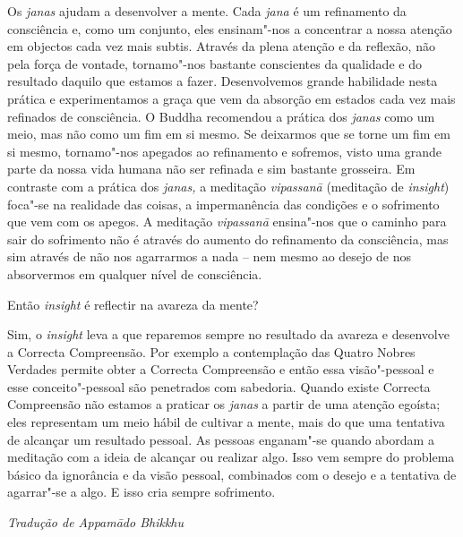  Os \emph{janas} ajudam a desenvolver a mente. Cada \emph{jana}
é um refinamento da consciência e, como um conjunto, eles ensinam"-nos a
concentrar a nossa atenção em objectos cada vez mais subtis. Através da
plena atenção e da reflexão, não pela força de vontade, tornamo"-nos
bastante conscientes da qualidade e do resultado daquilo que estamos a
fazer. Desenvolvemos grande habilidade nesta prática e experimentamos a
graça que vem da absorção em estados cada vez mais refinados de
consciência. O Buddha recomendou a prática dos \emph{janas} como um
meio, mas não como um fim em si mesmo. Se deixarmos que se torne um fim
em si mesmo, tornamo"-nos apegados ao refinamento e sofremos, visto uma
grande parte da nossa vida humana não ser refinada e sim bastante
grosseira. Em contraste com a prática dos \emph{janas,} a meditação
\emph{vipassanā} (meditação de \emph{insight}) foca"-se na realidade das
coisas, a impermanência das condições e o sofrimento que vem com os
apegos. A meditação \emph{vipassanā} ensina"-nos que o caminho para sair
do sofrimento não é através do aumento do refinamento da consciência,
mas sim através de não nos agarrarmos a nada -- nem mesmo ao desejo de
nos absorvermos em qualquer nível de consciência.

\bigskip

 Então \emph{insight} é reflectir na avareza da mente?

 Sim, o \emph{insight} leva a que reparemos sempre no resultado
da avareza e desenvolve a Correcta Compreensão. Por exemplo a
contemplação das Quatro Nobres Verdades permite obter a Correcta
Compreensão e então essa visão"-pessoal e esse conceito"-pessoal são
penetrados com sabedoria. Quando existe Correcta Compreensão não estamos
a praticar os \emph{janas} a partir de uma atenção egoísta; eles
representam um meio hábil de cultivar a mente, mais do que uma tentativa
de alcançar um resultado pessoal. As pessoas enganam"-se quando abordam a
meditação com a ideia de alcançar ou realizar algo. Isso vem sempre do
problema básico da ignorância e da visão pessoal, combinados com o
desejo e a tentativa de agarrar"-se a algo. E isso cria sempre
sofrimento.

\vfill
{\raggedleft\itshape\small
  Tradução de Appamādo Bhikkhu
\par}
